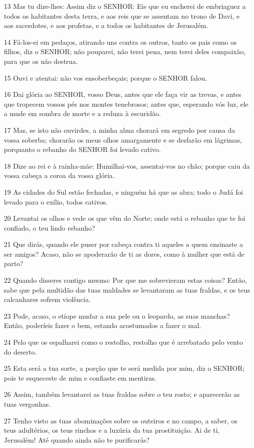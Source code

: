 \par 13 Mas tu dize-lhes: Assim diz o SENHOR: Eis que eu encherei de embriaguez a todos os habitantes desta terra, e aos reis que se assentam no trono de Davi, e aos sacerdotes, e aos profetas, e a todos os habitantes de Jerusalém.
\par 14 Fá-los-ei em pedaços, atirando uns contra os outros, tanto os pais como os filhos, diz o SENHOR; não pouparei, não terei pena, nem terei deles compaixão, para que os não destrua.
\par 15 Ouvi e atentai: não vos ensoberbeçais; porque o SENHOR falou.
\par 16 Dai glória ao SENHOR, vosso Deus, antes que ele faça vir as trevas, e antes que tropecem vossos pés nos montes tenebrosos; antes que, esperando vós luz, ele a mude em sombra de morte e a reduza à escuridão.
\par 17 Mas, se isto não ouvirdes, a minha alma chorará em segredo por causa da vossa soberba; chorarão os meus olhos amargamente e se desfarão em lágrimas, porquanto o rebanho do SENHOR foi levado cativo.
\par 18 Dize ao rei e à rainha-mãe: Humilhai-vos, assentai-vos no chão; porque caiu da vossa cabeça a coroa da vossa glória.
\par 19 As cidades do Sul estão fechadas, e ninguém há que as abra; todo o Judá foi levado para o exílio, todos cativos.
\par 20 Levantai os olhos e vede os que vêm do Norte; onde está o rebanho que te foi confiado, o teu lindo rebanho?
\par 21 Que dirás, quando ele puser por cabeça contra ti aqueles a quem ensinaste a ser amigos? Acaso, não se apoderarão de ti as dores, como à mulher que está de parto?
\par 22 Quando disseres contigo mesmo: Por que me sobrevieram estas coisas? Então, sabe que pela multidão das tuas maldades se levantaram as tuas fraldas, e os teus calcanhares sofrem violência.
\par 23 Pode, acaso, o etíope mudar a sua pele ou o leopardo, as suas manchas? Então, poderíeis fazer o bem, estando acostumados a fazer o mal.
\par 24 Pelo que os espalharei como o restolho, restolho que é arrebatado pelo vento do deserto.
\par 25 Esta será a tua sorte, a porção que te será medida por mim, diz o SENHOR; pois te esqueceste de mim e confiaste em mentiras.
\par 26 Assim, também levantarei as tuas fraldas sobre o teu rosto; e aparecerão as tuas vergonhas.
\par 27 Tenho visto as tuas abominações sobre os outeiros e no campo, a saber, os teus adultérios, os teus rinchos e a luxúria da tua prostituição. Ai de ti, Jerusalém! Até quando ainda não te purificarás?

